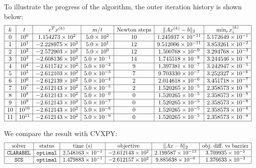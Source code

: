 \documentclass[11pt,letter,notitlepage]{article}
\theoremstyle{definition}
\begin{document}
\begin{solution}
To illustrate the progress of the algorithm, the outer iteration history is shown below:
\[
\begin{array}{|c|c|c|c|c|c|c|}
\hline
k & t & c^T x^{(k)} & m/t & \text{Newton steps} & \|Ax^{(k)}-b\|_2 & \min_i x_i^{(k)}\\
\hline
0 & 10^0   & 1.154273\times 10^2   & 5.0\times 10^2 & 10 & 1.245937\times 10^{-11} & 5.172649\times 10^{-1}\\
\hline
1 & 10^1   & -2.228975\times 10^2  & 5.0\times 10^1 & 12 & 9.512006\times 10^{-11} & 3.853261\times 10^{-2}\\
\hline
2 & 10^2   & -2.572903\times 10^2  & 5.0\times 10^0 & 12 & 1.500768\times 10^{-9}  & 3.294768\times 10^{-3}\\
\hline
3 & 10^3   & -2.608136\times 10^2  & 5.0\times 10^{-1} & 14 & 1.745518\times 10^{-8}  & 3.244546\times 10^{-4}\\
\hline
4 & 10^4   & -2.611742\times 10^2  & 5.0\times 10^{-2} & 9  & 1.397381\times 10^{-7}  & 3.242947\times 10^{-5}\\
\hline
5 & 10^5   & -2.612103\times 10^2  & 5.0\times 10^{-3} & 7  & 9.703330\times 10^{-7}  & 3.252327\times 10^{-6}\\
\hline
6 & 10^6   & -2.612139\times 10^2  & 5.0\times 10^{-4} & 2  & 2.014618\times 10^{-6}  & 3.451718\times 10^{-7}\\
\hline
7 & 10^7   & -2.612143\times 10^2  & 5.0\times 10^{-5} & 2  & 1.520265\times 10^{-5}  & 2.358573\times 10^{-8}\\
\hline
8 & 10^8   & -2.612143\times 10^2  & 5.0\times 10^{-6} & 0  & 1.520265\times 10^{-5}  & 2.358573\times 10^{-8}\\
\hline
9 & 10^9   & -2.612143\times 10^2  & 5.0\times 10^{-7} & 0  & 1.520265\times 10^{-5}  & 2.358573\times 10^{-8}\\
\hline
10 & 10^{10} & -2.612143\times 10^2 & 5.0\times 10^{-8} & 0  & 1.520265\times 10^{-5}  & 2.358573\times 10^{-8}\\
\hline
11 & 10^{11} & -2.612143\times 10^2 & 5.0\times 10^{-9} & 0  & 1.520265\times 10^{-5}  & 2.358573\times 10^{-8}\\
\hline
\end{array}
\]

We compare the result with CVXPY:
\[
\begin{array}{|c|c|c|c|c|c|}
\hline
\text{solver} & \text{status} & \text{time (s)} & \text{objective} & \|Ax-b\|_2 & \text{obj.\ diff.\ vs barrier}\\
\hline
\texttt{CLARABEL} & \texttt{optimal} & 2.548163\times 10^{-1}
& -2.612143\times 10^2 & 2.199587\times 10^{-13} & 3.709935\times 10^{-5}\\
\hline
\texttt{SCS} & \texttt{optimal} & 1.479883\times 10^{-1}
& -2.612157\times 10^2 & 9.885638\times 10^{-6} & 1.376633\times 10^{-3}\\
\hline
\end{array}
\]


\end{solution}
\end{document}
